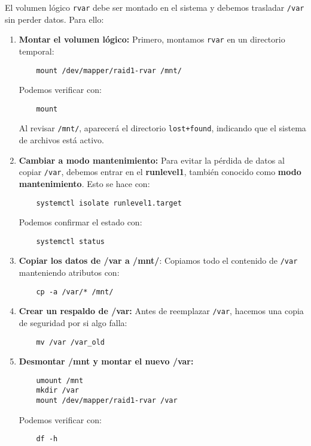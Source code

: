 El volumen lógico \texttt{rvar} debe ser montado en el sistema y debemos trasladar \texttt{/var} sin perder datos. Para ello:

\begin{enumerate}
    \item \textbf{Montar el volumen lógico:}  
    Primero, montamos \texttt{rvar} en un directorio temporal:
    \begin{verbatim}
    mount /dev/mapper/raid1-rvar /mnt/
    \end{verbatim}
    Podemos verificar con:
    \begin{verbatim}
    mount
    \end{verbatim}
    Al revisar \texttt{/mnt/}, aparecerá el directorio \texttt{lost+found}, indicando que el sistema de archivos está activo.

    \item \textbf{Cambiar a modo mantenimiento:}  
    Para evitar la pérdida de datos al copiar \texttt{/var}, debemos entrar en el \textbf{runlevel1}, también conocido como \textbf{modo mantenimiento}. Esto se hace con:
    \begin{verbatim}
    systemctl isolate runlevel1.target
    \end{verbatim}
    Podemos confirmar el estado con:
    \begin{verbatim}
    systemctl status
    \end{verbatim}

    \item \textbf{Copiar los datos de /var a /mnt/}:  
    Copiamos todo el contenido de \texttt{/var} manteniendo atributos con:
    \begin{verbatim}
    cp -a /var/* /mnt/
    \end{verbatim}

    \item \textbf{Crear un respaldo de /var:}  
    Antes de reemplazar \texttt{/var}, hacemos una copia de seguridad por si algo falla:
    \begin{verbatim}
    mv /var /var_old
    \end{verbatim}

    \item \textbf{Desmontar /mnt y montar el nuevo /var:}  
    \begin{verbatim}
    umount /mnt
    mkdir /var
    mount /dev/mapper/raid1-rvar /var
    \end{verbatim}
    Podemos verificar con:
    \begin{verbatim}
    df -h
    \end{verbatim}


\end{enumerate}
